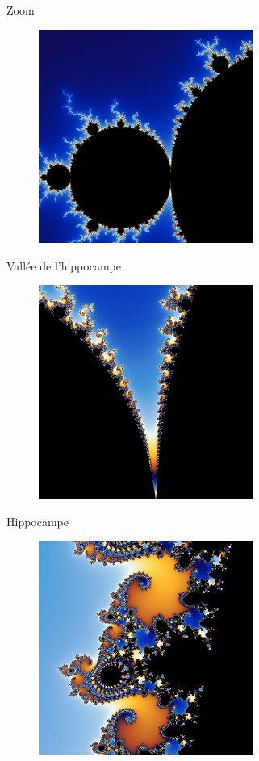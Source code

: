 \documentclass{beamer}
\begin{document}
\begin{frame}{Zoom}
\begin{figure}[H]
  \centering
  \includegraphics[width=70mm]{zoom.png}
 \end{figure}
\end{frame}

\begin{frame}{Vallée de l'hippocampe}
\begin{figure}[H]
  \centering
  \includegraphics[width=70mm]{vallee_hippocampe.png}
 \end{figure}
\end{frame}

\begin{frame}{Hippocampe}
\begin{figure}[H]
  \centering
  \includegraphics[width=70mm]{hippocampe.png}
 \end{figure}
\end{frame}
\end{document}
